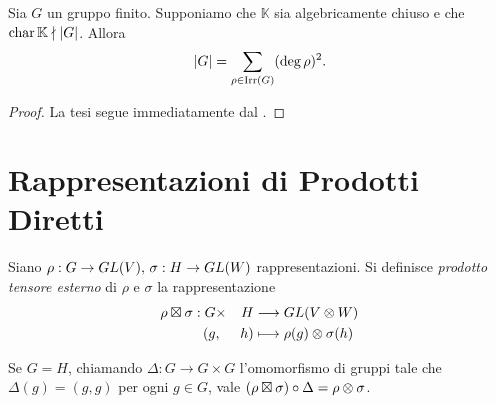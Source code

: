 \begin{corollary}
Sia $G$ un gruppo finito. Supponiamo che $\mathbb{K}$ sia algebricamente chiuso e che $\operatorname{char}\mathbb{K}\nmid |G|$. Allora
$$
|G|=\sum_{\rho\in\operatorname{Irr}(G)}(\deg\rho)^2.
$$
\end{corollary}
\begin{proof}
La tesi segue immediatamente dal .
\end{proof}

\section{Rappresentazioni di Prodotti Diretti}

\begin{definition}
Siano $\rho:G\to GL(V),\,\allowbreak\sigma:H\to GL(W)$ rappresentazioni. Si definisce \emph{prodotto tensore esterno} di $\rho$ e $\sigma$ la rappresentazione
\begin{alignat*}{2}
\rho\boxtimes\sigma:G&\times &H&\longrightarrow GL(V\otimes W)\\
(g&,&h)&\longmapsto\rho(g)\otimes\sigma(h)
\end{alignat*}
\end{definition}

\begin{remark}
Se $G=H$, chiamando $\Delta:G\to G\times G$ l'omomorfismo di gruppi tale che $\Delta(g)=(g,g)$ per ogni $g\in G$, vale $(\rho\boxtimes\sigma)\circ\Delta=\rho\otimes\sigma$.
\end{remark}



